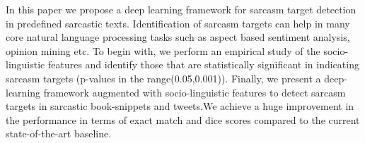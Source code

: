 In  this  paper  we  propose  a  deep  learning framework for sarcasm target detection in predefined  sarcastic  texts.   Identification  of  sarcasm targets can help in many core natural language  processing  tasks  such  as  aspect  based sentiment  analysis,  opinion  mining  etc.    To begin  with,  we  perform  an  empirical  study of  the  socio-linguistic  features  and  identify those  that  are  statistically  significant  in  indicating  sarcasm  targets  (p-values  in  the  range(0.05,0.001)).    Finally,  we  present  a  deep-learning  framework  augmented  with  socio-linguistic  features  to  detect  sarcasm  targets in  sarcastic  book-snippets  and  tweets.We achieve  a  huge  improvement  in  the  performance in terms of exact match and dice scores  compared  to  the  current  state-of-the-art baseline.